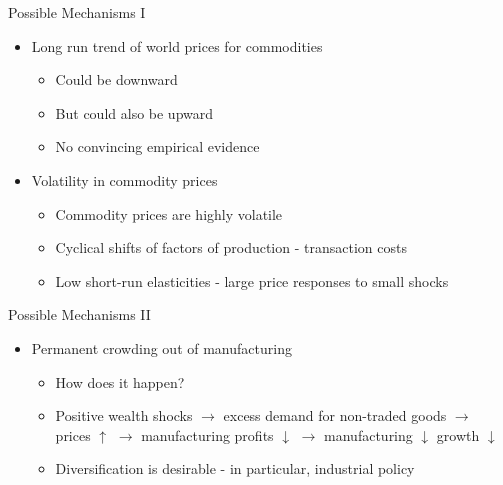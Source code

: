 \documentclass[11pt,notes=hide,aspectratio=169,mathserif]{beamer}
\begin{document}
\begin{frame}{Possible Mechanisms I}

\begin{itemize}
\item Long run trend of world prices for commodities
\begin{itemize}
    \pause \item Could be downward
    \pause \item But could also be upward 
    \pause \item No convincing empirical evidence
\end{itemize}
\item Volatility in commodity prices 
\begin{itemize}
    \pause \item Commodity prices are highly volatile
    \pause \item Cyclical shifts of factors of production - transaction costs 
    \pause \item Low short-run elasticities - large price responses to small shocks
\end{itemize}
\end{itemize}
\end{frame}

\begin{frame}{Possible Mechanisms II}
\begin{itemize}
\item Permanent crowding out of manufacturing 
\begin{itemize}
    \pause \item How does it happen?
    \pause \item Positive wealth shocks $\rightarrow$ excess demand for non-traded goods $\rightarrow$ prices $\uparrow$ $\rightarrow$ manufacturing profits $\downarrow$ $\rightarrow$ manufacturing $\downarrow$ growth $\downarrow$
    \pause \item Diversification is desirable - in particular, industrial policy 
\end{itemize}
\end{itemize}
\end{frame}
\end{document}
